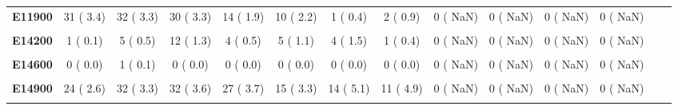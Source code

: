\documentclass[
]{article}
\begin{document}
\begin{table}[H]
\begin{tabular}[t]{>{\raggedright\arraybackslash}p{5em}ccccccccccccc}
\textbf{E11900} & 31 (  3.4) & 32 (  3.3) & 30 (  3.3) & 14 (  1.9) & 10 (  2.2) & 1 (  0.4) & 2 (  0.9) & 0 (  NaN) & 0 (  NaN) & 0 (  NaN) & 0 (  NaN) &  & \\
\textbf{\cellcolor{gray!10}{E14000}} & \cellcolor{gray!10}{1 (  0.1)} & \cellcolor{gray!10}{0 (  0.0)} & \cellcolor{gray!10}{1 (  0.1)} & \cellcolor{gray!10}{0 (  0.0)} & \cellcolor{gray!10}{0 (  0.0)} & \cellcolor{gray!10}{0 (  0.0)} & \cellcolor{gray!10}{0 (  0.0)} & \cellcolor{gray!10}{0 (  NaN)} & \cellcolor{gray!10}{0 (  NaN)} & \cellcolor{gray!10}{0 (  NaN)} & \cellcolor{gray!10}{0 (  NaN)} & \cellcolor{gray!10}{} & \cellcolor{gray!10}{}\\
\textbf{E14200} & 1 (  0.1) & 5 (  0.5) & 12 (  1.3) & 4 (  0.5) & 5 (  1.1) & 4 (  1.5) & 1 (  0.4) & 0 (  NaN) & 0 (  NaN) & 0 (  NaN) & 0 (  NaN) &  & \\
\textbf{\cellcolor{gray!10}{E14500}} & \cellcolor{gray!10}{4 (  0.4)} & \cellcolor{gray!10}{2 (  0.2)} & \cellcolor{gray!10}{1 (  0.1)} & \cellcolor{gray!10}{1 (  0.1)} & \cellcolor{gray!10}{1 (  0.2)} & \cellcolor{gray!10}{1 (  0.4)} & \cellcolor{gray!10}{1 (  0.4)} & \cellcolor{gray!10}{0 (  NaN)} & \cellcolor{gray!10}{0 (  NaN)} & \cellcolor{gray!10}{0 (  NaN)} & \cellcolor{gray!10}{0 (  NaN)} & \cellcolor{gray!10}{} & \cellcolor{gray!10}{}\\
\textbf{E14600} & 0 (  0.0) & 1 (  0.1) & 0 (  0.0) & 0 (  0.0) & 0 (  0.0) & 0 (  0.0) & 0 (  0.0) & 0 (  NaN) & 0 (  NaN) & 0 (  NaN) & 0 (  NaN) &  & \\
\textbf{\cellcolor{gray!10}{E14700}} & \cellcolor{gray!10}{7 (  0.8)} & \cellcolor{gray!10}{3 (  0.3)} & \cellcolor{gray!10}{5 (  0.6)} & \cellcolor{gray!10}{3 (  0.4)} & \cellcolor{gray!10}{2 (  0.4)} & \cellcolor{gray!10}{3 (  1.1)} & \cellcolor{gray!10}{0 (  0.0)} & \cellcolor{gray!10}{0 (  NaN)} & \cellcolor{gray!10}{0 (  NaN)} & \cellcolor{gray!10}{0 (  NaN)} & \cellcolor{gray!10}{0 (  NaN)} & \cellcolor{gray!10}{} & \cellcolor{gray!10}{}\\
\textbf{E14900} & 24 (  2.6) & 32 (  3.3) & 32 (  3.6) & 27 (  3.7) & 15 (  3.3) & 14 (  5.1) & 11 (  4.9) & 0 (  NaN) & 0 (  NaN) & 0 (  NaN) & 0 (  NaN) &  & \\
\textbf{\cellcolor{gray!10}{E16200}} & \cellcolor{gray!10}{0 (  0.0)} & \cellcolor{gray!10}{0 (  0.0)} & \cellcolor{gray!10}{1 (  0.1)} & \cellcolor{gray!10}{0 (  0.0)} & \cellcolor{gray!10}{0 (  0.0)} & \cellcolor{gray!10}{0 (  0.0)} & \cellcolor{gray!10}{0 (  0.0)} & \cellcolor{gray!10}{0 (  NaN)} & \cellcolor{gray!10}{0 (  NaN)} & \cellcolor{gray!10}{0 (  NaN)} & \cellcolor{gray!10}{0 (  NaN)} & \cellcolor{gray!10}{} & \cellcolor{gray!10}{}\\

\end{tabular}
\end{table}
\end{document}
